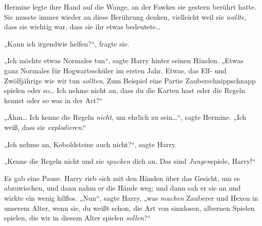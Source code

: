 Hermine legte ihre Hand auf die Wange, an der Fawkes sie gestern berührt hatte. Sie musste immer wieder an diese Berührung denken, vielleicht weil sie \emph{wollte}, dass sie wichtig war, dass sie ihr etwas bedeutete…

„Kann ich irgendwie helfen?“, fragte sie.

„Ich möchte etwas Normales tun“, sagte Harry hinter seinen Händen. „Etwas ganz Normales für Hogwartsschüler im ersten Jahr. Etwas, das Elf- und Zwölfjährige wie wir tun \emph{sollten}. Zum Beispiel eine Partie Zauberschnippschnapp spielen oder so… Ich nehme nicht an, dass du die Karten hast oder die Regeln kennst oder so was in der Art?“

„Ähm… Ich kenne die Regeln \emph{nicht}, um ehrlich zu sein…“, sagte Hermine. „Ich weiß, dass sie \emph{explodieren}.“

„Ich nehme an, Koboldsteine auch nicht?“, sagte Harry.

„Kenne die Regeln nicht und sie \emph{spucken} dich an. Das sind \emph{Jungen}{}spiele, Harry!“

Es gab eine Pause. Harry rieb sich mit den Händen über das Gesicht, um es abzuwischen, und dann nahm er die Hände weg; und dann sah er sie an und wirkte ein wenig hilflos. „Nun“, sagte Harry, „was \emph{machen} Zauberer und Hexen in unserem Alter, wenn sie, du weißt schon, die Art von sinnlosen, albernen Spielen spielen, die wir in diesem Alter spielen \emph{sollen}?“

